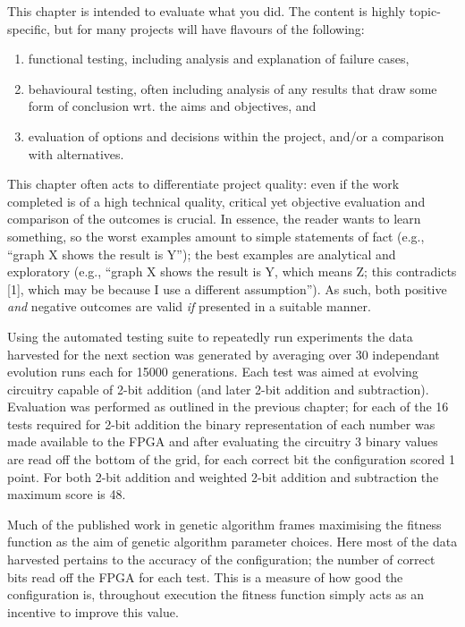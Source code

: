 \noindent
{
\color{red}
This chapter is intended to evaluate what you did.  The content is highly
topic-specific, but for many projects will have flavours of the following:

\begin{enumerate}
\item functional  testing, including analysis and explanation of failure
      cases,
\item behavioural testing, often including analysis of any results that
      draw some form of conclusion wrt. the aims and objectives,
      and
\item evaluation of options and decisions within the project, and/or a
      comparison with alternatives.
\end{enumerate}

\noindent
This chapter often acts to differentiate project quality: even if the work
completed is of a high technical quality, critical yet objective evaluation
and comparison of the outcomes is crucial.  In essence, the reader wants to
learn something, so the worst examples amount to simple statements of fact
(e.g., ``graph X shows the result is Y''); the best examples are analytical
and exploratory (e.g., ``graph X shows the result is Y, which means Z; this
contradicts [1], which may be because I use a different assumption'').  As
such, both positive {\em and} negative outcomes are valid {\em if} presented
in a suitable manner.
}

Using the automated testing suite to repeatedly run experiments the data
harvested for the next section
was generated by averaging over 30 independant evolution runs
each for 15000 generations. Each test was aimed at evolving circuitry
capable of 2-bit addition (and later 2-bit addition and subtraction). Evaluation
was performed as outlined in the previous chapter; for each of the 16 tests required
for 2-bit addition the binary representation of each number was made available
to the FPGA and after evaluating the circuitry 3 binary values are read off
the bottom of the grid, for each
correct bit the configuration scored 1 point. For both 2-bit addition and weighted 2-bit
addition and subtraction the maximum score is 48.

Much of the published work in genetic algorithm frames maximising the fitness function
as the aim of genetic algorithm parameter choices. Here most of the data harvested
pertains to the accuracy of the configuration; the number of correct bits read off
the FPGA for each test. This is a measure of how good the configuration is, throughout
execution the fitness function simply acts as an incentive to improve this value.

